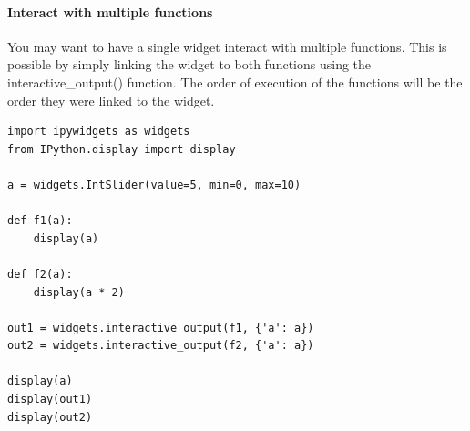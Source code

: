 \paragraph{Interact with multiple functions}

You may want to have a single widget interact with multiple functions. This is possible by simply linking the widget to both functions using the interactive\_output() function. The order of execution of the functions will be the order they were linked to the widget.

\begin{verbatim}
import ipywidgets as widgets
from IPython.display import display

a = widgets.IntSlider(value=5, min=0, max=10)

def f1(a):
    display(a)
    
def f2(a):
    display(a * 2)
    
out1 = widgets.interactive_output(f1, {'a': a})
out2 = widgets.interactive_output(f2, {'a': a})

display(a)
display(out1)
display(out2)
\end{verbatim}
